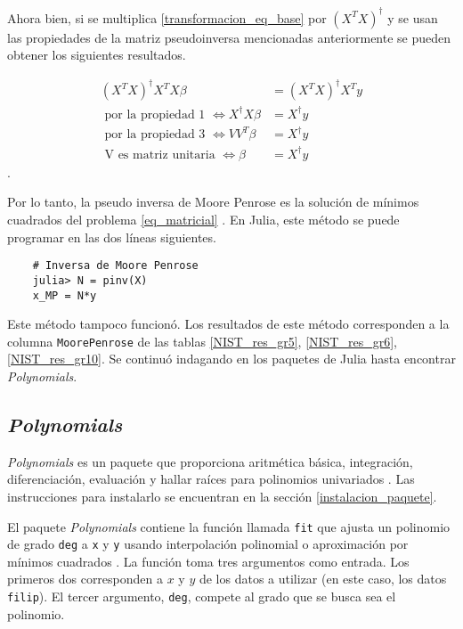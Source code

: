 Ahora bien, si se multiplica \ref{transformacion_eq_base} por $(X^{T}X)^{\dagger}$ y se usan las propiedades de la matriz pseudoinversa mencionadas anteriormente se pueden obtener los siguientes resultados. 

\begin{equation*}
    \begin{aligned}
    (X^{T}X)^{\dagger} X^{T}X \beta &= (X^{T}X)^{\dagger} X^{T} y \\
    \text{ por la propiedad 1 }\iff X^{\dagger} X \beta &= X^{\dagger} y \\
    \text{ por la propiedad 3 } \iff V V^{T} \beta &= X^{\dagger} y \\
    \text{ V es matriz unitaria } \iff \beta &= X^{\dagger} y 
    \end{aligned}
\end{equation*}. 

Por lo tanto, la pseudo inversa de Moore Penrose es la solución de mínimos cuadrados del problema \ref{eq_matricial} \citep{worldScientificNews}. En Julia, este método se puede programar en las dos líneas siguientes. 

\begin{verbatim}
    # Inversa de Moore Penrose
    julia> N = pinv(X)
    x_MP = N*y 
\end{verbatim}

Este método tampoco funcionó. Los resultados de este método corresponden a la columna \texttt{MoorePenrose} de las tablas \ref{NIST_res_gr5}, \ref{NIST_res_gr6}, \ref{NIST_res_gr10}. Se continuó indagando en los paquetes de Julia hasta encontrar \textit{Polynomials}. 

\subsection{\textit{Polynomials}}
\textit{Polynomials} \citep{software_polynomials} es un paquete que proporciona aritmética básica, integración, diferenciación, evaluación y hallar raíces para polinomios univariados \citep{poly_manual}. Las instrucciones para instalarlo se encuentran en la sección \ref{instalacion_paquete}. 


El paquete \textit{Polynomials} contiene la función llamada \texttt{fit} que ajusta un polinomio de grado \texttt{deg} a \texttt{x} y \texttt{y} usando interpolación polinomial o aproximación por mínimos cuadrados \citep{poly_manual}. La función toma tres argumentos como entrada. Los primeros dos corresponden a $x$ y $y$ de los datos a utilizar (en este caso, los datos \texttt{filip}). El tercer argumento, \texttt{deg},  compete al grado que se busca sea el polinomio. 

